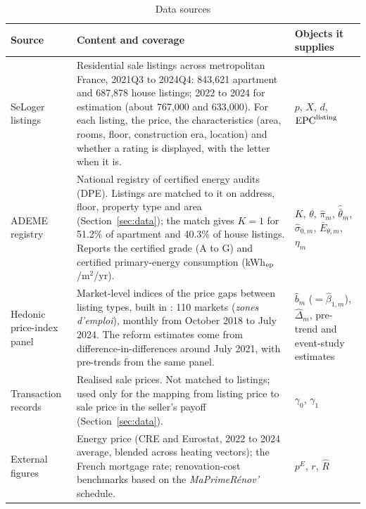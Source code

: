 \begin{table}[htbp]
\centering
\caption{Data sources}
\label{tab:app_data}
\footnotesize\renewcommand{\arraystretch}{1.25}
\begin{tabular}{@{}lll@{}}
\toprule\toprule
\textbf{Source} & \textbf{Content and coverage} & \textbf{Objects it supplies} \\
\midrule
\parbox[t]{.16\textwidth}{\raggedright SeLoger listings} & \parbox[t]{.52\textwidth}{\raggedright Residential sale listings across metropolitan France, 2021Q3 to 2024Q4: 843,621 apartment and 687,878 house listings; 2022 to 2024 for estimation (about 767,000 and 633,000). For each listing, the price, the characteristics (area, rooms, floor, construction era, location) and whether a rating is displayed, with the letter when it is.} & \parbox[t]{.24\textwidth}{\raggedright $p$, $X$, $d$, $\text{EPC}^{\rm listing}$} \\[12pt]
\parbox[t]{.16\textwidth}{\raggedright ADEME registry} & \parbox[t]{.52\textwidth}{\raggedright National registry of certified energy audits (DPE). Listings are matched to it on address, floor, property type and area (Section~\ref{sec:data}); the match gives $K=1$ for 51.2\% of apartment and 40.3\% of house listings. Reports the certified grade (A to G) and certified primary-energy consumption (kWh$_{\rm ep}$/m$^2$/yr).} & \parbox[t]{.24\textwidth}{\raggedright $K$, $\theta$, $\hat\pi_m$, $\hat{\bar\theta}_m$, $\hat\sigma_{0,m}$, $\bar E_{\theta,m}$, $\eta_m$} \\[12pt]
\parbox[t]{.16\textwidth}{\raggedright Hedonic price-index panel} & \parbox[t]{.52\textwidth}{\raggedright Market-level indices of the price gaps between listing types, built in \citet{patras_mandatory_2024}: 110 markets (\textit{zones d'emploi}), monthly from October 2018 to July 2024. The reform estimates come from difference-in-differences around July 2021, with pre-trends from the same panel.} & \parbox[t]{.24\textwidth}{\raggedright $\hat b_m$ ($=\hat\beta_{1,m}$), $\hat\Delta_m$, pre-trend and event-study estimates} \\[12pt]
\parbox[t]{.16\textwidth}{\raggedright Transaction records} & \parbox[t]{.52\textwidth}{\raggedright Realised sale prices. Not matched to listings; used only for the mapping from listing price to sale price in the seller's payoff (Section~\ref{sec:data}).} & \parbox[t]{.24\textwidth}{\raggedright $\gamma_0$, $\gamma_1$} \\[12pt]
\parbox[t]{.16\textwidth}{\raggedright External figures} & \parbox[t]{.52\textwidth}{\raggedright Energy price (CRE and Eurostat, 2022 to 2024 average, blended across heating vectors); the French mortgage rate; renovation-cost benchmarks based on the \textit{MaPrimeR\'{e}nov'} schedule.} & \parbox[t]{.24\textwidth}{\raggedright $p^E$, $r$, $\hat R$} \\[12pt]
\bottomrule
\end{tabular}
\end{table}

